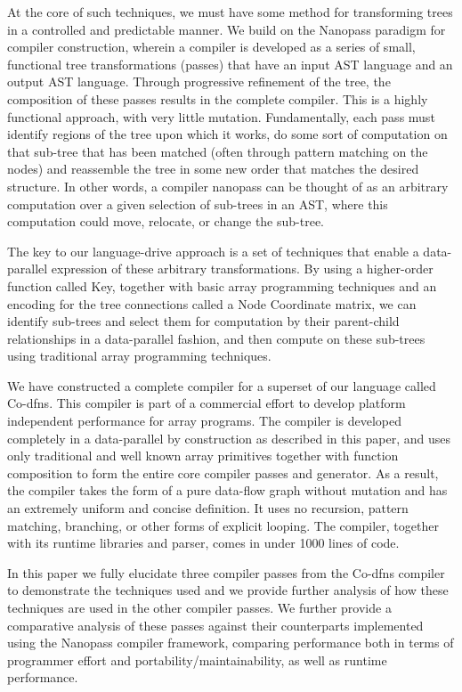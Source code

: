 \documentclass[numbers,preprint]{sigplanconf}
\begin{document}
At the core of such techniques, we must have some method for transforming trees in a controlled and 
predictable manner. We build on the Nanopass paradigm for compiler construction, wherein a compiler is 
developed as a series of small, functional tree transformations (passes) that have an input AST language 
and an output AST language. Through progressive refinement of the tree, the composition of these 
passes results in the complete compiler. This is a highly functional approach, with very little mutation. 
Fundamentally, each pass must identify regions of the tree upon which it works, do some sort of computation 
on that sub-tree that has been matched (often through pattern matching on the nodes) and reassemble 
the tree in some new order that matches the desired structure. In other words, a compiler nanopass 
can be thought of as an arbitrary computation over a given selection of sub-trees in an AST, where 
this computation could move, relocate, or change the sub-tree. 

The key to our language-drive approach is a set of techniques that enable a data-parallel expression of 
these arbitrary transformations. By using a higher-order function called Key, together with basic array 
programming techniques and an encoding for the tree connections called a Node Coordinate matrix, we can 
identify sub-trees and select them for computation by their parent-child relationships in a data-parallel 
fashion, and then compute on these sub-trees using traditional array programming techniques. 

We have constructed a complete compiler for a superset of our language called Co-dfns. This compiler is 
part of a commercial effort to develop platform independent performance for array programs. The 
compiler is developed completely in a data-parallel by construction as described in this paper, and uses 
only traditional and well known array primitives together with function composition to form the entire 
core compiler passes and generator. As a result, the compiler takes the form of a pure data-flow graph 
without mutation and has an extremely uniform and concise definition. It uses no recursion, pattern 
matching, branching, or other forms of explicit looping. The compiler, together with its runtime libraries 
and parser, comes in under 1000 lines of code. 

In this paper we fully elucidate three compiler passes from the Co-dfns compiler to demonstrate the 
techniques used and we provide further analysis of how these techniques are used in the other compiler 
passes. We further provide a comparative analysis of these passes against their counterparts implemented 
using the Nanopass compiler framework, comparing performance both in terms of programmer effort and 
portability/maintainability, as well as runtime performance. 
\end{document}
